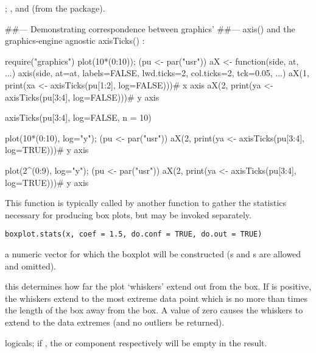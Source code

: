 %
\begin{SeeAlso}\relax
{};
, and  (from
the  package).
\end{SeeAlso}
%
\begin{Examples}
\begin{ExampleCode}
##--- Demonstrating correspondence between graphics'
##--- axis() and the graphics-engine agnostic  axisTicks() :

require("graphics")
plot(10*(0:10)); (pu <- par("usr"))
aX <- function(side, at, ...)
    axis(side, at=at, labels=FALSE, lwd.ticks=2, col.ticks=2, tck=0.05, ...)
aX(1, print(xa <- axisTicks(pu[1:2], log=FALSE)))# x axis
aX(2, print(ya <- axisTicks(pu[3:4], log=FALSE)))# y axis

axisTicks(pu[3:4], log=FALSE, n = 10)

plot(10*(0:10), log="y"); (pu <- par("usr"))
aX(2, print(ya <- axisTicks(pu[3:4], log=TRUE)))# y axis

plot(2^(0:9), log="y"); (pu <- par("usr"))
aX(2, print(ya <- axisTicks(pu[3:4], log=TRUE)))# y axis

\end{ExampleCode}
\end{Examples}
%
\begin{Description}\relax
This function is typically called by another function to
gather the statistics necessary for producing box plots,
but may be invoked separately.
\end{Description}
%
\begin{Usage}
\begin{verbatim}
boxplot.stats(x, coef = 1.5, do.conf = TRUE, do.out = TRUE)
\end{verbatim}
\end{Usage}
%
\begin{Arguments}
\begin{ldescription}
\item[\code{x}] a numeric vector for which the boxplot will
be constructed (s and s are allowed
and omitted).
\item[\code{coef}] this determines how far the plot `whiskers' extend out
from the box.  If  is positive, the whiskers extend to the
most extreme data point which is no more than  times
the length of the box away from the box. A value of zero causes
the whiskers
to extend to the data extremes (and no outliers be returned).
\item[\code{do.conf,do.out}] logicals; if , the  or
 component respectively will be empty in the result.
\end{ldescription}
\end{Arguments}
